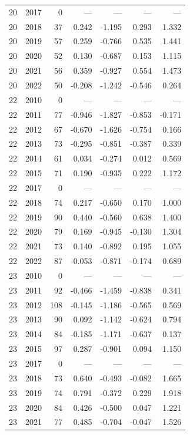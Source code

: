 \begin{longtable}{llrrrrr}
20 & 2017 & 0 & --- & --- & --- & --- \\
20 & 2018 & 37 & 0.242 & -1.195 & 0.293 & 1.332 \\
20 & 2019 & 57 & 0.259 & -0.766 & 0.535 & 1.441 \\
20 & 2020 & 52 & 0.130 & -0.687 & 0.153 & 1.115 \\
20 & 2021 & 56 & 0.359 & -0.927 & 0.554 & 1.473 \\
20 & 2022 & 50 & -0.208 & -1.242 & -0.546 & 0.264 \\
22 & 2010 & 0 & --- & --- & --- & --- \\
22 & 2011 & 77 & -0.946 & -1.827 & -0.853 & -0.171 \\
22 & 2012 & 67 & -0.670 & -1.626 & -0.754 & 0.166 \\
22 & 2013 & 73 & -0.295 & -0.851 & -0.387 & 0.339 \\
22 & 2014 & 61 & 0.034 & -0.274 & 0.012 & 0.569 \\
22 & 2015 & 71 & 0.190 & -0.935 & 0.222 & 1.172 \\
22 & 2017 & 0 & --- & --- & --- & --- \\
22 & 2018 & 74 & 0.217 & -0.650 & 0.170 & 1.000 \\
22 & 2019 & 90 & 0.440 & -0.560 & 0.638 & 1.400 \\
22 & 2020 & 79 & 0.169 & -0.945 & -0.130 & 1.304 \\
22 & 2021 & 73 & 0.140 & -0.892 & 0.195 & 1.055 \\
22 & 2022 & 87 & -0.053 & -0.871 & -0.174 & 0.689 \\
23 & 2010 & 0 & --- & --- & --- & --- \\
23 & 2011 & 92 & -0.466 & -1.459 & -0.838 & 0.341 \\
23 & 2012 & 108 & -0.145 & -1.186 & -0.565 & 0.569 \\
23 & 2013 & 90 & 0.092 & -1.142 & -0.624 & 0.794 \\
23 & 2014 & 84 & -0.185 & -1.171 & -0.637 & 0.137 \\
23 & 2015 & 97 & 0.287 & -0.901 & 0.094 & 1.150 \\
23 & 2017 & 0 & --- & --- & --- & --- \\
23 & 2018 & 73 & 0.640 & -0.493 & -0.082 & 1.665 \\
23 & 2019 & 74 & 0.791 & -0.372 & 0.229 & 1.918 \\
23 & 2020 & 84 & 0.426 & -0.500 & 0.047 & 1.221 \\
23 & 2021 & 77 & 0.485 & -0.704 & -0.047 & 1.526 \\

\end{longtable}
